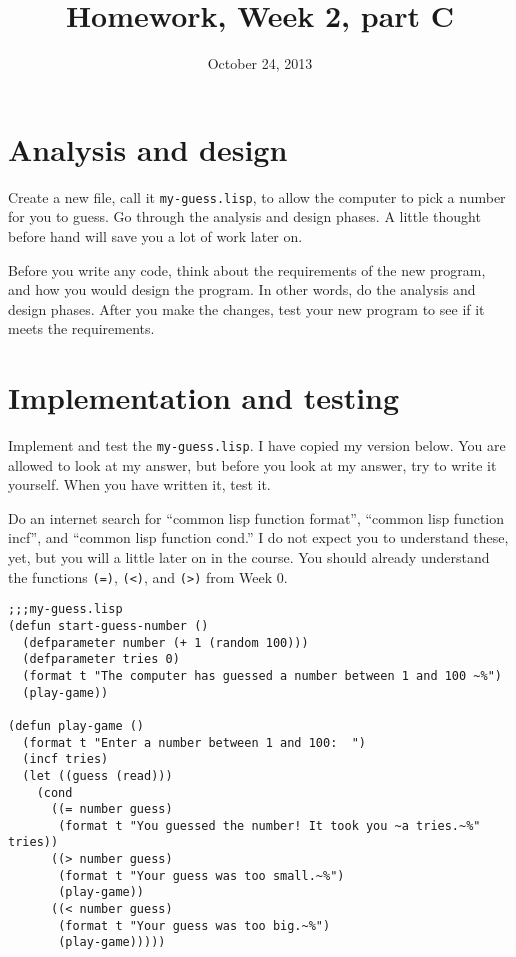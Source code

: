 \documentclass{article}
\title{Homework, Week 2, part C}
\date{October 24, 2013}
\begin{document}
\maketitle{}

\section{Analysis and design}

Create a new file, call it \texttt{my-guess.lisp}, to allow the computer to pick a number for you to guess. Go through the analysis and design phases. A little thought before hand will save you a lot of work later on.

 Before you write any code, think about the requirements of the new program, and how you would design the program. In other words, do the analysis and design phases. After you make the changes, test your new program to see if it meets the requirements.

\section{Implementation and testing}

Implement and test the \texttt{my-guess.lisp}. I have copied my version below. You are allowed to look at my answer, but before you look at my answer, try to write it yourself. When you have written it, test it.

Do an internet search for ``common lisp function format'', ``common lisp function incf'', and ``common lisp function cond.'' I do not expect you to understand these, yet, but you will a little later on in the course. You should already understand the functions \texttt{(=)}, \texttt{(<)}, and \texttt{(>)} from Week 0.

\lstset{language=Lisp,numbers=left,keepspaces=true,basicstyle=\small,numberstyle=\tiny,showstringspaces=false,breaklines=true}
\begin{lstlisting}
;;;my-guess.lisp
(defun start-guess-number ()
  (defparameter number (+ 1 (random 100)))
  (defparameter tries 0)
  (format t "The computer has guessed a number between 1 and 100 ~%")
  (play-game))

(defun play-game ()
  (format t "Enter a number between 1 and 100:  ")
  (incf tries)
  (let ((guess (read)))
    (cond
      ((= number guess)
       (format t "You guessed the number! It took you ~a tries.~%" tries))
      ((> number guess)
       (format t "Your guess was too small.~%")
       (play-game))
      ((< number guess)
       (format t "Your guess was too big.~%")
       (play-game)))))
\end{lstlisting}
\end{document}
